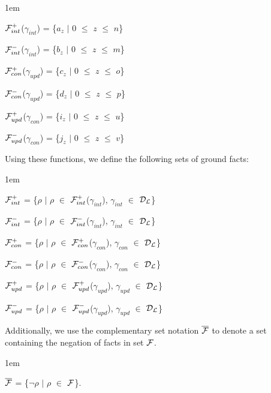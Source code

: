 \documentclass[global,twocolumn,final]{svjour}
\newenvironment{vquote}
  {\begin{list}{}{\leftmargin 1em}\item[]}
  {\end{list}}
\begin{document}
    \begin{vquote}
      ${\cal F}^{+}_{int}$($\gamma_{int}$) = \{$a_{z}$ $\mid$ $0$ $\leq$ $z$ $\leq$ $n$\}

      ${\cal F}^{-}_{int}$($\gamma_{int}$) = \{$b_{z}$ $\mid$ $0$ $\leq$ $z$ $\leq$ $m$\}

      ${\cal F}^{+}_{con}$($\gamma_{upd}$) = \{$c_{z}$ $\mid$ $0$ $\leq$ $z$ $\leq$ $o$\}

      ${\cal F}^{-}_{con}$($\gamma_{upd}$) = \{$d_{z}$ $\mid$ $0$ $\leq$ $z$ $\leq$ $p$\}

      ${\cal F}^{+}_{upd}$($\gamma_{con}$) = \{$i_{z}$ $\mid$ $0$ $\leq$ $z$ $\leq$ $u$\}

      ${\cal F}^{-}_{upd}$($\gamma_{con}$) = \{$j_{z}$ $\mid$ $0$ $\leq$ $z$ $\leq$ $v$\}
    \end{vquote}

    Using these functions, we define the following sets of ground facts:

    \begin{vquote}
      ${\cal F}^{+}_{int}$ =
      \{$\rho$ $\mid$ $\rho$ $\in$ ${\cal F}^{+}_{int}$($\gamma_{int}$), $\gamma_{int}$ $\in$ ${\cal D}_{\cal L}$\}

      ${\cal F}^{-}_{int}$ =
      \{$\rho$ $\mid$ $\rho$ $\in$ ${\cal F}^{-}_{int}$($\gamma_{int}$), $\gamma_{int}$ $\in$ ${\cal D}_{\cal L}$\}

      ${\cal F}^{+}_{con}$ =
      \{$\rho$ $\mid$ $\rho$ $\in$ ${\cal F}^{+}_{con}$($\gamma_{con}$), $\gamma_{con}$ $\in$ ${\cal D}_{\cal L}$\}

      ${\cal F}^{-}_{con}$ =
      \{$\rho$ $\mid$ $\rho$ $\in$ ${\cal F}^{-}_{con}$($\gamma_{con}$), $\gamma_{con}$ $\in$ ${\cal D}_{\cal L}$\}

      ${\cal F}^{+}_{upd}$ =
      \{$\rho$ $\mid$ $\rho$ $\in$ ${\cal F}^{+}_{upd}$($\gamma_{upd}$), $\gamma_{upd}$ $\in$ ${\cal D}_{\cal L}$\}

      ${\cal F}^{-}_{upd}$ =
      \{$\rho$ $\mid$ $\rho$ $\in$ ${\cal F}^{-}_{upd}$($\gamma_{upd}$), $\gamma_{upd}$ $\in$ ${\cal D}_{\cal L}$\}
    \end{vquote}

    Additionally, we use the complementary set notation
    $\overline{{\cal F}}$ to denote a set containing the negation of
    facts in set ${\cal F}$.

    \begin{vquote}
      $\overline{{\cal F}}$ =
      \{$\lnot\rho$ $\mid$ $\rho$ $\in$ ${\cal F}$\}.
    \end{vquote}
\end{document}
